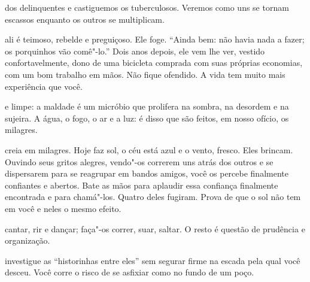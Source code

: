  dos delinquentes e castiguemos os tuberculosos. Veremos como
uns se tornam escassos enquanto os outros se multiplicam.



 ali é teimoso, rebelde e preguiçoso. Ele foge. ``Ainda bem: não
havia nada a fazer; os porquinhos vão comê"-lo.'' Dois anos depois, ele
vem lhe ver, vestido confortavelmente, dono de uma bicicleta comprada
com suas próprias economias, com um bom trabalho em mãos. Não fique
ofendido. A vida tem muito mais experiência que você.

\pagebreak


 e limpe: a maldade é um micróbio que prolifera na sombra, na
desordem e na sujeira. A água, o fogo, o ar e a luz: é disso que são
feitos, em nosso ofício, os milagres.



 creia em milagres. Hoje faz sol, o céu está azul e o vento, fresco.
Eles brincam. Ouvindo seus gritos alegres, vendo"-os correrem uns atrás
dos outros e se dispersarem para se reagrupar em bandos amigos, você os
percebe finalmente confiantes e abertos. Bate as mãos para aplaudir essa
confiança finalmente encontrada e para chamá"-los. Quatro deles fugiram.
Prova de que o sol não tem em você e neles o mesmo efeito.



 cantar, rir e dançar; faça"-os correr, suar, saltar. O resto é
questão de prudência e organização.



 investigue as ``historinhas entre eles'' sem segurar firme na escada
pela qual você desceu. Você corre o risco de se asfixiar como no fundo
de um poço.



\pagebreak
\thispagestyle{empty}

